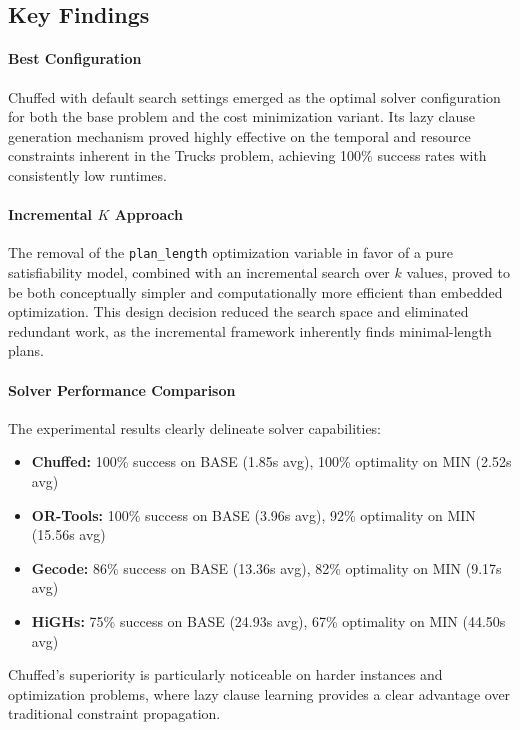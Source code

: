\documentclass[a4paper,12pt]{article}
\begin{document}
\subsection{Key Findings}

\paragraph{Best Configuration} Chuffed with default search settings emerged as the optimal solver configuration for both the base problem and the cost minimization variant. Its lazy clause generation mechanism proved highly effective on the temporal and resource constraints inherent in the Trucks problem, achieving 100\% success rates with consistently low runtimes.

\paragraph{Incremental $K$ Approach} The removal of the \texttt{plan\_length} optimization variable in favor of a pure satisfiability model, combined with an incremental search over $k$ values, proved to be both conceptually simpler and computationally more efficient than embedded optimization. This design decision reduced the search space and eliminated redundant work, as the incremental framework inherently finds minimal-length plans.

\paragraph{Solver Performance Comparison} The experimental results clearly delineate solver capabilities:
\begin{itemize}
    \item \textbf{Chuffed:} 100\% success on BASE (1.85s avg), 100\% optimality on MIN (2.52s avg)
    \item \textbf{OR-Tools:} 100\% success on BASE (3.96s avg), 92\% optimality on MIN (15.56s avg)
    \item \textbf{Gecode:} 86\% success on BASE (13.36s avg), 82\% optimality on MIN (9.17s avg)
    \item \textbf{HiGHs:} 75\% success on BASE (24.93s avg), 67\% optimality on MIN (44.50s avg)
\end{itemize}
Chuffed's superiority is particularly noticeable on harder instances and optimization problems, where lazy clause learning provides a clear advantage over traditional constraint propagation.
\end{document}

